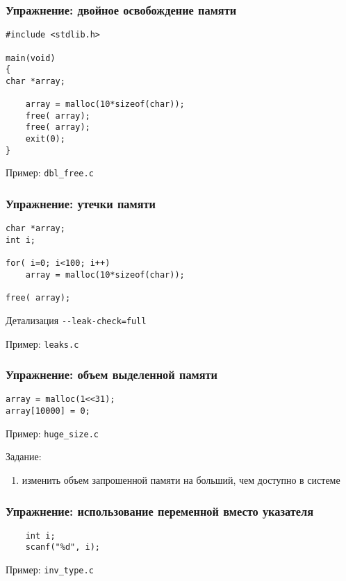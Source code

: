 \begin{frame}[fragile]
	\frametitle{Упражнение: двойное освобождение памяти}

	\begin{lstlisting}
#include <stdlib.h>

main(void)
{
char *array;

    array = malloc(10*sizeof(char));
    free( array);
    free( array);
    exit(0);
}
	\end{lstlisting}

	Пример: {\tt dbl\_free.c}

\end{frame}



\begin{frame}[fragile]
	\frametitle{Упражнение: утечки памяти}

	\begin{lstlisting}
char *array;
int i;

for( i=0; i<100; i++)
    array = malloc(10*sizeof(char));

free( array);
	\end{lstlisting}

	\begin{block}{Детализация}
		{\tt -{}-leak-check=full}
	\end{block}

	Пример: {\tt leaks.c}

\end{frame}

\begin{frame}[fragile]
	\frametitle{Упражнение: объем выделенной памяти}

	\begin{lstlisting}
array = malloc(1<<31);
array[10000] = 0;
	\end{lstlisting}

	Пример: {\tt huge\_size.c}
	
	\bigskip
	\pause

	Задание:
	\begin{enumerate}
		\item изменить объем запрошенной памяти на больший, чем доступно в системе
	\end{enumerate}

\end{frame}

\begin{frame}[fragile]
	\frametitle{Упражнение: использование переменной вместо указателя}

	\begin{lstlisting}
    int i;
    scanf("%d", i);
	\end{lstlisting}

	Пример: {\tt inv\_type.c}
\end{frame}

